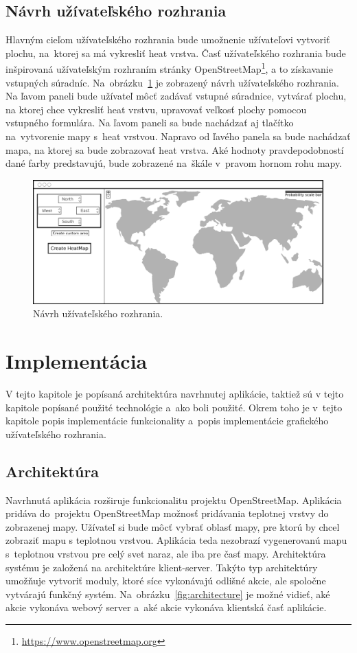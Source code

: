 \section{Návrh užívateľského rozhrania}
Hlavným cieľom užívateľského rozhrania bude umožnenie užívateľovi vytvoriť plochu, na~ktorej sa má vykresliť heat vrstva. Časť užívateľského rozhrania bude inšpirovaná užívateľským rozhraním stránky OpenStreetMap\footnote{\url{https://www.openstreetmap.org}}, a to získavanie vstupných súradníc. Na~obrázku~\ref{fig:ui-mockup} je zobrazený návrh užívateľského rozhrania. Na ľavom paneli bude užívateľ môcť zadávať vstupné súradnice, vytvárať plochu, na ktorej chce vykresliť heat vrstvu, upravovať veľkosť plochy pomocou vstupného formulára. Na ľavom paneli sa bude nachádzať aj tlačítko na~vytvorenie mapy s~heat vrstvou. Napravo od ľavého panela sa bude nachádzať mapa, na ktorej sa bude zobrazovať heat vrstva. Aké hodnoty pravdepodobností dané farby predstavujú, bude zobrazené na~škále v~pravom hornom rohu mapy.

\begin{figure}[ht]
    \centering
    \includegraphics[width=0.98\linewidth]{obrazky-figures/ui-mockup.pdf}
    \caption{Návrh užívateľského rozhrania.}
    \label{fig:ui-mockup}
\end{figure}



\chapter{Implementácia}
\label{implementacia}
V tejto kapitole je popísaná architektúra navrhnutej aplikácie, taktiež sú v tejto kapitole popísané použité technológie a~ako boli použité. Okrem toho je v~tejto kapitole popis implementácie funkcionality a~popis implementácie grafického užívateľského rozhrania.


\section{Architektúra}
Navrhnutá aplikácia rozširuje funkcionalitu projektu OpenStreetMap. Aplikácia pridáva do~projektu OpenStreetMap možnosť pridávania teplotnej vrstvy do zobrazenej mapy. Užívateľ si bude môcť vybrať oblasť mapy, pre ktorú by chcel zobraziť mapu s teplotnou vrstvou. Aplikácia teda nezobrazí vygenerovanú mapu s~teplotnou vrstvou pre celý svet naraz, ale iba pre časť mapy. Architektúra systému je založená na architektúre klient-server. Takýto typ architektúry umožňuje vytvoriť moduly, ktoré síce vykonávajú odlišné akcie, ale spoločne vytvárajú funkčný systém. Na~obrázku~\ref{fig:architecture} je možné vidieť, aké akcie vykonáva webový server a~aké akcie vykonáva klientská časť aplikácie.

